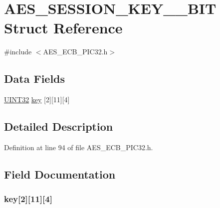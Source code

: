 \hypertarget{struct_a_e_s___s_e_s_s_i_o_n___k_e_y__128___b_i_t}{}\section{A\+E\+S\+\_\+\+S\+E\+S\+S\+I\+O\+N\+\_\+\+K\+E\+Y\+\_\+\_\+\+B\+I\+T Struct Reference}
\label{struct_a_e_s___s_e_s_s_i_o_n___k_e_y__128___b_i_t}


{\ttfamily \#include $<$A\+E\+S\+\_\+\+E\+C\+B\+\_\+\+P\+I\+C32.\+h$>$}

\subsection*{Data Fields}
\begin{DoxyCompactItemize}
\item 
\hyperlink{_generic_type_defs_8h_a1720f33f59b583f0c2ed071815623a86}{U\+I\+N\+T32} \hyperlink{struct_a_e_s___s_e_s_s_i_o_n___k_e_y__128___b_i_t_aa5c8c8612f168fdcf904fb6f58f17539}{key} \mbox{[}2\mbox{]}\mbox{[}11\mbox{]}\mbox{[}4\mbox{]}
\end{DoxyCompactItemize}


\subsection{Detailed Description}


Definition at line 94 of file A\+E\+S\+\_\+\+E\+C\+B\+\_\+\+P\+I\+C32.\+h.



\subsection{Field Documentation}
\hypertarget{struct_a_e_s___s_e_s_s_i_o_n___k_e_y__128___b_i_t_aa5c8c8612f168fdcf904fb6f58f17539}{}
\subsubsection[{key}]{ key\mbox{[}2\mbox{]}\mbox{[}11\mbox{]}\mbox{[}4\mbox{]}}\label{struct_a_e_s___s_e_s_s_i_o_n___k_e_y__128___b_i_t_aa5c8c8612f168fdcf904fb6f58f17539}


